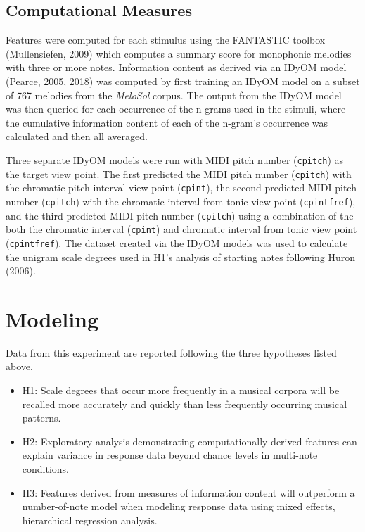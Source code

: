 \documentclass[english,man,floatsintext]{apa6}
\providecommand{\tightlist}{%
  \setlength{\itemsep}{0pt}\setlength{\parskip}{0pt}}
\begin{document}
\hypertarget{computational-measures}{%
\subsection{Computational Measures}\label{computational-measures}}

Features were computed for each stimulus using the FANTASTIC toolbox (Mullensiefen, 2009) which computes a summary score for monophonic melodies with three or more notes.
Information content as derived via an IDyOM model (Pearce, 2005, 2018) was computed by first training an IDyOM model on a subset of 767 melodies from the \emph{MeloSol} corpus.
The output from the IDyOM model was then queried for each occurrence of the n-grams used in the stimuli, where the cumulative information content of each of the n-gram's occurrence was calculated and then all averaged.

Three separate IDyOM models were run with MIDI pitch number (\texttt{cpitch}) as the target view point.
The first predicted the MIDI pitch number (\texttt{cpitch}) with the chromatic pitch interval view point (\texttt{cpint}), the second predicted MIDI pitch number (\texttt{cpitch}) with the chromatic interval from tonic view point (\texttt{cpintfref}), and the third predicted MIDI pitch number (\texttt{cpitch}) using a combination of the both the chromatic interval (\texttt{cpint}) and chromatic interval from tonic view point (\texttt{cpintfref}).
The dataset created via the IDyOM models was used to calculate the unigram scale degrees used in H1's analysis of starting notes following Huron (2006).

\hypertarget{modeling}{%
\section{Modeling}\label{modeling}}

Data from this experiment are reported following the three hypotheses listed above.

\begin{itemize}
\tightlist
\item
  H1: Scale degrees that occur more frequently in a musical corpora will be recalled more accurately and quickly than less frequently occurring musical patterns.
\item
  H2: Exploratory analysis demonstrating computationally derived features can explain variance in response data beyond chance levels in multi-note conditions.\\
\item
  H3: Features derived from measures of information content will outperform a number-of-note model when modeling response data using mixed effects, hierarchical regression analysis.
\end{itemize}
\end{document}
